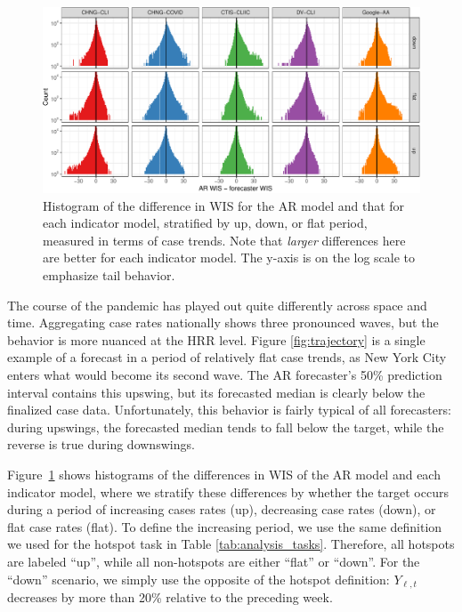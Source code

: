 \documentclass[9pt,twocolumn,twoside,lineno]{pnas-new}
\begin{document}
\begin{figure}[t]
  \includegraphics[width=\textwidth]{fig/upswing-histogram-1.pdf}
  \caption{Histogram of the difference in WIS for the AR model and that for each
    indicator model, stratified by up, down, or flat period, measured in terms
    of case trends. Note that \textit{larger} differences here are better for
    each indicator model.  The y-axis is on the log scale to emphasize tail 
    behavior.}   
  \label{fig:up_down_flat}
\end{figure}

The course of the pandemic has played out quite differently across space and
time. Aggregating case rates nationally shows three pronounced waves, but the
behavior is more nuanced at the HRR level.  Figure \ref{fig:trajectory} is a
single example of a forecast in a period of relatively flat case trends, as New
York City enters what would become its second wave. The AR forecaster's 50\%
prediction interval contains this upswing, but its forecasted median is clearly
below the finalized case data.  Unfortunately, this behavior is fairly typical
of all forecasters: during upswings, the forecasted median tends to fall below 
the target, while the reverse is true during downswings.

Figure~\ref{fig:up_down_flat} shows histograms of the differences in WIS of the 
AR model and each indicator model, where we stratify these differences by
whether the target occurs during a period of increasing cases rates (up),
decreasing case rates (down), or flat case rates (flat). To define the
increasing period, we use the same definition we used for the hotspot task in
Table \ref{tab:analysis_tasks}.  Therefore, all hotspots are labeled ``up'',
while all non-hotspots are either ``flat'' or ``down''.  For the ``down''
scenario, we simply use the opposite of the hotspot definition: $Y_{\ell,t}$
decreases by more than 20\% relative to the preceding week.  
\end{document}

